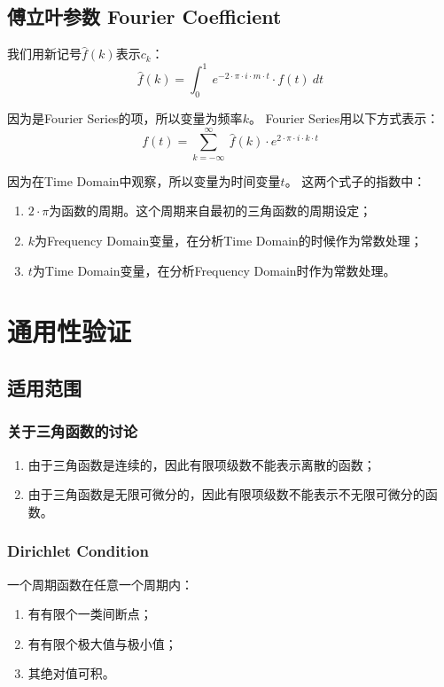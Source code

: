 \subsection{傅立叶参数 Fourier Coefficient}
我们用新记号$\hat{f}(k)$表示$c_k$：
\begin{equation}
	\hat{f}(k)=\int_0^1 \ e^{-2\cdot \pi\cdot i\cdot m\cdot t}\cdot f(t)\ dt
\end{equation}

因为是Fourier Series的项，所以变量为频率$k$。
Fourier Series用以下方式表示：
\begin{equation}
	f(t)=\sum\limits_{k=-\infty}^\infty\ \hat{f}(k)\cdot e^{2\cdot \pi\cdot i\cdot k\cdot t }
\end{equation}

因为在Time Domain中观察，所以变量为时间变量$t$。
这两个式子的指数中：
\begin{enumerate}
	\item $2\cdot \pi$为函数的周期。这个周期来自最初的三角函数的周期设定；
	\item $k​$为Frequency Domain变量，在分析Time Domain的时候作为常数处理；
	\item $t$为Time Domain变量，在分析Frequency Domain时作为常数处理。
\end{enumerate}
\section{通用性验证}
\subsection{适用范围}
\subsubsection{关于三角函数的讨论}
\begin{enumerate}
	\item 由于三角函数是连续的，因此有限项级数不能表示离散的函数；
	\item 由于三角函数是无限可微分的，因此有限项级数不能表示不无限可微分的函数。
\end{enumerate}


\subsubsection{Dirichlet Condition}
一个周期函数在任意一个周期内：
\begin{enumerate}
	\item 有有限个一类间断点；
	\item 有有限个极大值与极小值；
	\item 其绝对值可积。
\end{enumerate}

